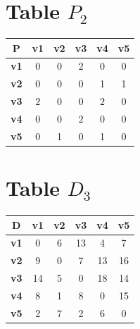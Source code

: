 \documentclass{article}
\begin{document}
\section{Table $P_{2}$}
\begin{center}
    \begin{tabular}{|c||c|c|c|c|c|}
        \hline
        \textbf{P} & \textbf{v1} & \textbf{v2} & \textbf{v3} & \textbf{v4} & \textbf{v5} \\
        \hline
        \hline
        \textbf{v1}& 0 & 0 & \cellcolor[HTML]{D74894}$2$ & 0 & 0 \\
        \hline
        \textbf{v2}& 0 & 0 & 0 & 1 & 1 \\
        \hline
        \textbf{v3}& \cellcolor[HTML]{D74894}$2$ & 0 & 0 & \cellcolor[HTML]{D74894}$2$ & 0 \\
        \hline
        \textbf{v4}& 0 & 0 & \cellcolor[HTML]{D74894}$2$ & 0 & 0 \\
        \hline
        \textbf{v5}& 0 & 1 & 0 & 1 & 0 \\
        \hline
    \end{tabular}
\end{center}


\section{Table $D_{3}$}
\begin{center}
    \begin{tabular}{|c||c|c|c|c|c|}
        \hline
        \textbf{D} & \textbf{v1} & \textbf{v2} & \textbf{v3} & \textbf{v4} & \textbf{v5} \\
        \hline
        \hline
        \textbf{v1}& 0 & 6 & 13 & 4 & 7 \\
        \hline
        \textbf{v2}& 9 & 0 & 7 & 13 & 16 \\
        \hline
        \textbf{v3}& 14 & 5 & 0 & 18 & 14 \\
        \hline
        \textbf{v4}& 8 & 1 & 8 & 0 & 15 \\
        \hline
        \textbf{v5}& 2 & \cellcolor[HTML]{D74894}$7$ & 2 & 6 & 0 \\
        \hline
    \end{tabular}
\end{center}
\end{document}
